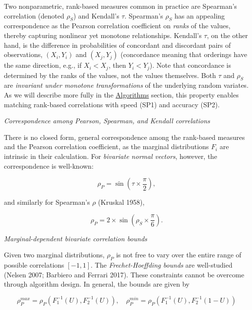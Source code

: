 \documentclass{article}
\begin{document}
Two nonparametric, rank-based measures common in practice are Spearman's
correlation (denoted \(\rho_S\)) and Kendall's \(\tau\). Spearman's
\(\rho_S\) has an appealing correspondence as the Pearson correlation
coefficient on \emph{ranks} of the values, thereby capturing nonlinear
yet monotone relationships. Kendall's \(\tau\), on the other hand, is
the difference in probabilities of concordant and discordant pairs of
observations, \((X_i, Y_i)\) and \((X_j, Y_j)\) (concordance meaning
that orderings have the same direction, e.g., if \(X_i < X_j\), then
\(Y_i < Y_j\)). Note that concordance is determined by the ranks of the
values, not the values themselves. Both \(\tau\) and \(\rho_S\) are
\emph{invariant under monotone transformations} of the underlying random
variates. As we will describe more fully in the
\protect\hyperlink{algorithms}{Algorithms} section, this property
enables matching rank-based correlations with speed (SP1) and accuracy
(SP2).

\emph{Correspondence among Pearson, Spearman, and Kendall correlations}

There is no closed form, general correspondence among the rank-based
measures and the Pearson correlation coefficient, as the marginal
distributions \(F_i\) are intrinsic in their calculation. For
\emph{bivariate normal vectors}, however, the correspondence is
well-known:

\begin{equation}
\label{eq:convertKendall}
\rho_{P} = \sin \left( \tau \times \frac{\pi}{2} \right), 
\end{equation}

\noindent and similarly for Spearman's \(\rho\) (Kruskal 1958),

\begin{equation}
\label{eq:convertSpearman}
\rho_P = 2 \times \sin \left( \rho_S \times \frac{\pi}{6} \right).
\end{equation}

\emph{Marginal-dependent bivariate correlation bounds}

Given two marginal distributions, \(\rho_P\) is not free to vary over
the entire range of possible correlations \([-1,1]\). The
\emph{Frechet-Hoeffding bounds} are well-studied (Nelsen 2007; Barbiero
and Ferrari 2017). These constraints cannot be overcome through
algorithm design. In general, the bounds are given by

\begin{equation}
\label{eq:frechet}
\rho_P^{max} = \rho_P \left( F^{-1}_1 (U), F^{-1}_2 (U) \right), \quad \rho_P^{min} = \rho_P \left( F^{-1}_1 (U), F^{-1}_2 (1 - U) \right)
\end{equation}
\end{document}
